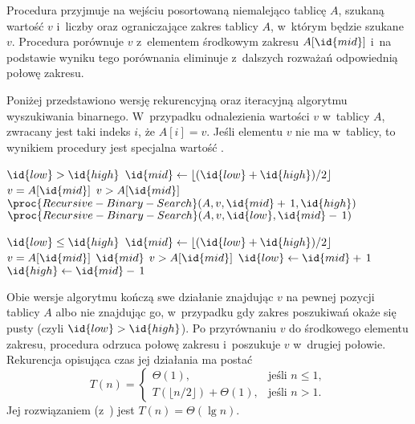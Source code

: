 \exercise %
Procedura  przyjmuje na wejściu posortowaną niemalejąco tablicę $A$, szukaną wartość $v$ i~liczby  oraz  ograniczające zakres tablicy $A$, w~którym będzie szukane $v$. Procedura porównuje $v$ z~elementem środkowym zakresu $A[\id{mid}]$ i~na podstawie wyniku tego porównania eliminuje z~dalszych rozważań odpowiednią połowę zakresu.

Poniżej przedstawiono wersję rekurencyjną oraz iteracyjną algorytmu wyszukiwania binarnego. W~przypadku odnalezienia wartości $v$ w~tablicy $A$, zwracany jest taki indeks $i$, że $A[i]=v$. Jeśli elementu $v$ nie ma w~tablicy, to wynikiem procedury jest specjalna wartość .

\begin{codebox}
\li	\If $\id{low}>\id{high}$
\li		\Then \Return {}
		\End
\li	$\id{mid}\gets\lfloor(\id{low}+\id{high})/2\rfloor$
\li	\If $v=A[\id{mid}]$
\li		\Then \Return {}
		\End
\li	\If $v>A[\id{mid}]$
\li		\Then \Return $\proc{Recursive-Binary-Search}(A,v,\id{mid}+\,1,\id{high})$
\li		\Else \Return $\proc{Recursive-Binary-Search}(A,v,\id{low},\id{mid}-\,1)$
		\End
\end{codebox}

\begin{codebox}
\li	\While $\id{low}\le\id{high}$
\li		\Do
			$\id{mid}\gets\lfloor(\id{low}+\id{high})/2\rfloor$
\li			\If $v=A[\id{mid}]$
\li				\Then \Return $\id{mid}$
				\End
\li			\If $v>A[\id{mid}]$
\li				\Then $\id{low}\gets\id{mid}+\,1$
\li				\Else $\id{high}\gets\id{mid}-\,1$
				\End
		\End
\li	\Return {}
\end{codebox}

Obie wersje algorytmu  kończą swe działanie znajdując $v$ na pewnej pozycji tablicy $A$ albo nie znajdując go, w~przypadku gdy zakres poszukiwań okaże się pusty (czyli $\id{low}>\id{high}$). Po przyrównaniu $v$ do środkowego elementu zakresu, procedura odrzuca połowę zakresu i~poszukuje $v$ w~drugiej połowie. Rekurencja opisująca czas jej działania ma postać
\[
	T(n) =
	\begin{cases}
		\Theta(1), & \text{jeśli $n\le1$}, \\
		T(\lfloor n/2\rfloor)+\Theta(1), & \text{jeśli $n>1$}.
	\end{cases}
\]
Jej rozwiązaniem (z~) jest $T(n)=\Theta(\lg n)$.

